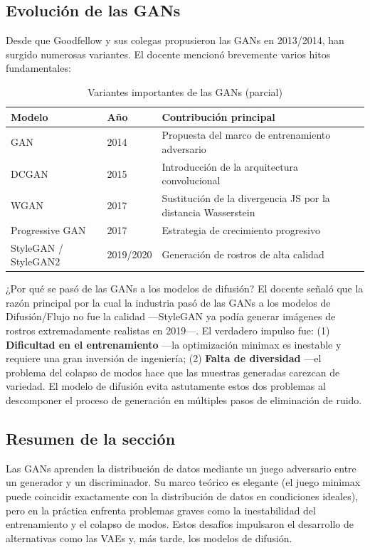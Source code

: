 \documentclass[a4paper]{article}
\begin{document}
\subsection{Evolución de las GANs}

Desde que Goodfellow y sus colegas propusieron las GANs en 2013/2014, han surgido numerosas variantes. El docente mencionó brevemente varios hitos fundamentales:

\begin{table}[H]
\centering
\begin{tabular}{lll}
\toprule
Modelo & Año & Contribución principal \\
\midrule
GAN & 2014 & Propuesta del marco de entrenamiento adversario \\
DCGAN & 2015 & Introducción de la arquitectura convolucional \\
WGAN & 2017 & Sustitución de la divergencia JS por la distancia Wasserstein \\
Progressive GAN & 2017 & Estrategia de crecimiento progresivo \\
StyleGAN / StyleGAN2 & 2019/2020 & Generación de rostros de alta calidad \\
\bottomrule
\end{tabular}
\caption{Variantes importantes de las GANs (parcial)}
\end{table}

\begin{knowledgebox}{¿Por qué se pasó de las GANs a los modelos de difusión?}
El docente señaló que la razón principal por la cual la industria pasó de las GANs a los modelos de Difusión/Flujo no fue la calidad —StyleGAN ya podía generar imágenes de rostros extremadamente realistas en 2019—. El verdadero impulso fue: (1) \textbf{Dificultad en el entrenamiento} —la optimización minimax es inestable y requiere una gran inversión de ingeniería; (2) \textbf{Falta de diversidad} —el problema del colapso de modos hace que las muestras generadas carezcan de variedad. El modelo de difusión evita astutamente estos dos problemas al descomponer el proceso de generación en múltiples pasos de eliminación de ruido.
\end{knowledgebox}

\subsection{Resumen de la sección}

Las GANs aprenden la distribución de datos mediante un juego adversario entre un generador y un discriminador. Su marco teórico es elegante (el juego minimax puede coincidir exactamente con la distribución de datos en condiciones ideales), pero en la práctica enfrenta problemas graves como la inestabilidad del entrenamiento y el colapso de modos. Estos desafíos impulsaron el desarrollo de alternativas como las VAEs y, más tarde, los modelos de difusión.
\end{document}
